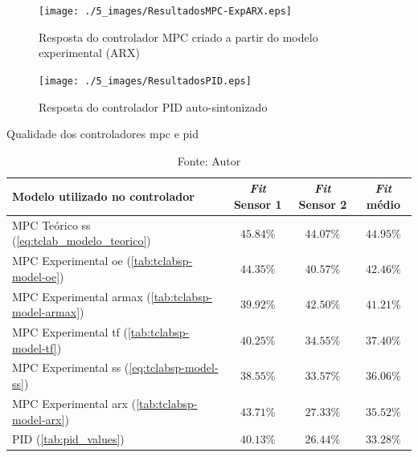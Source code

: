 \begin{figure}[!h]
	\caption{Resposta do controlador MPC criado a partir do modelo experimental (ARX)}
	\begin{center}
		\texttt{[image: ./5\_images/ResultadosMPC-ExpARX.eps]} 
		\label{fig:resultadosmpc-exparx}
	\end{center}
	\centering
\end{figure}

\begin{figure}[!h]
	\caption{Resposta do controlador PID auto-sintonizado}
	\begin{center}
		\texttt{[image: ./5\_images/ResultadosPID.eps]} 
		\label{fig:resultadospid}
	\end{center}
	\centering
\end{figure}

\begin{table}[!h]
	\centering
	\caption{Qualidade dos controladores \acrshort{mpc} e \acrshort{pid}}
	\label{tab:resultados_mpc_e_pid}
	\begin{tabular}{l|cc|c} \toprule
		{Modelo utilizado no controlador}              			            &	{\textit{Fit} Sensor 1}	    &	{\textit{Fit} Sensor 2}     & {\textit{Fit} médio}			    \\ \midrule
		MPC Teórico \acrshort{ss} (\cref{eq:tclab_modelo_teorico})	        &   $45.84\%$                   &   $44.07\%$                   &   $44.95\%$                       \\ 
		MPC Experimental \acrshort{oe} (\cref{tab:tclabsp-model-oe})	    &   $44.35\%$                   &   $40.57\%$                   &   $42.46\%$                       \\ 
		MPC Experimental \acrshort{armax} (\cref{tab:tclabsp-model-armax})	&   $39.92\%$                   &   $42.50\%$                   &   $41.21\%$                       \\ 
		MPC Experimental \acrshort{tf} (\cref{tab:tclabsp-model-tf})		&   $40.25\%$                   &   $34.55\%$                   &   $37.40\%$                       \\ 
		MPC Experimental \acrshort{ss} (\cref{eq:tclabsp-model-ss})			&   $38.55\%$                   &   $33.57\%$                   &   $36.06\%$                       \\ 
		MPC Experimental \acrshort{arx}	(\cref{tab:tclabsp-model-arx})		&   $43.71\%$                   &   $27.33\%$                   &   $35.52\%$                       \\ 
		PID (\cref{tab:pid_values})	                                        &   $40.13\%$                   &   $26.44\%$                   &   $33.28\%$                       \\ \bottomrule 
	\end{tabular}
	\caption*{Fonte: Autor}
\end{table}

